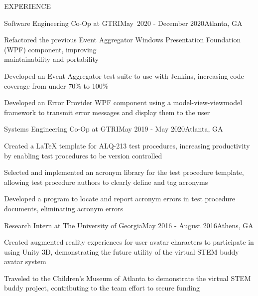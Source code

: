 \documentclass{resume}
\begin{document}
\begin{rSection}{EXPERIENCE}
	\begin{rSubsection}{Software Engineering Co-Op at GTRI}{May~2020 - December 2020}{}{}{Atlanta, GA}
		\item Refactored the previous Event Aggregator Windows Presentation Foundation (WPF) component, improving \\ maintainability and portability
		\item Developed an Event Aggregator test suite to use with Jenkins, increasing code coverage from under 70\% to 100\%
		\item Developed an Error Provider WPF component using a model-view-viewmodel framework to transmit error messages and display them to the user
	\end{rSubsection} 
	\begin{rSubsection}{Systems Engineering Co-Op at GTRI}{May 2019 - May 2020}{}{}{Atlanta, GA}
		\item Created a LaTeX template for ALQ-213 test procedures, increasing productivity by enabling test procedures to be version controlled
		\item Selected and implemented an acronym library for the test procedure template, allowing test procedure authors to clearly define and tag acronyms
		\item Developed a program to locate and report acronym errors in test procedure documents, eliminating acronym errors
	\end{rSubsection} 
	\begin{rSubsection}{Research Intern at The University of Georgia}{May 2016 - August 2016}{}{}{Athens, GA}
		\item Created augmented reality experiences for user avatar characters to participate in using Unity 3D, demonstrating the future utility of the virtual STEM buddy avatar system
		\item Traveled to the Children’s Museum of Atlanta to demonstrate the virtual STEM buddy project, contributing to the team effort to secure funding
	\end{rSubsection} 
\end{rSection} 
\end{document}
